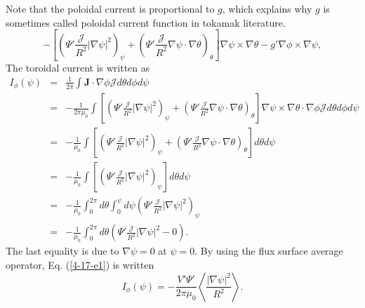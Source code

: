\documentclass{article}
\begin{document}
Note that the poloidal current is proportional to $g$, which explains why $g$
is sometimes called poloidal current function in tokamak literature.
\[ - \left[ \left( \Psi' \frac{\mathcal{J}}{R^2} | \nabla \psi |^2
   \right)_{\psi} + \left( \Psi' \frac{\mathcal{J}}{R^2} \nabla \psi \cdot
   \nabla \theta \right)_{\theta} \right] \nabla \psi \times \nabla \theta -
   g' \nabla \phi \times \nabla \psi, \]
The toroidal current is written as
\begin{eqnarray}
  I_{\phi} (\psi) & = & \frac{1}{2 \pi} \int \mathbf{J} \cdot \nabla \phi
  \mathcal{J}d \theta d \phi d \psi \nonumber\\
  & = & - \frac{1}{2 \pi \mu_0} \int \left[ \left( \Psi'
  \frac{\mathcal{J}}{R^2} | \nabla \psi |^2 \right)_{\psi} + \left( \Psi'
  \frac{\mathcal{J}}{R^2} \nabla \psi \cdot \nabla \theta \right)_{\theta}
  \right] \nabla \psi \times \nabla \theta \cdot \nabla \phi \mathcal{J}d
  \theta d \phi d \psi \nonumber\\
  & = & - \frac{1}{\mu_0} \int \left[ \left( \Psi' \frac{\mathcal{J}}{R^2} |
  \nabla \psi |^2 \right)_{\psi} + \left( \Psi' \frac{\mathcal{J}}{R^2} \nabla
  \psi \cdot \nabla \theta \right)_{\theta} \right] d \theta d \psi
  \nonumber\\
  & = & - \frac{1}{\mu_0} \int \left[ \left( \Psi' \frac{\mathcal{J}}{R^2} |
  \nabla \psi |^2 \right)_{\psi} \right] d \theta d \psi \nonumber\\
  & = & - \frac{1}{\mu_0} \int_0^{2 \pi} d \theta \int_0^{\psi} d \psi \left(
  \Psi' \frac{\mathcal{J}}{R^2} | \nabla \psi |^2 \right)_{\psi} \nonumber\\
  & = & - \frac{1}{\mu_0} \int_0^{2 \pi} d \theta \left( \Psi'
  \frac{\mathcal{J}}{R^2} | \nabla \psi |^2 - 0 \right) .  \label{4-17-e1}
\end{eqnarray}
The last equality is due to $\nabla \psi = 0$ at $\psi = 0$. By using the flux
surface average operator, Eq. (\ref{4-17-e1}) is written
\begin{equation}
  I_{\phi} (\psi) = - \frac{V' \Psi'}{2 \pi \mu_0} \left\langle \frac{| \nabla
  \psi |^2}{R^2} \right\rangle .
\end{equation}
\end{document}
